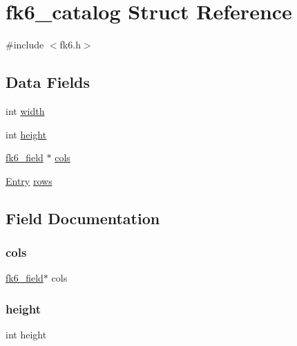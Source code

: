 \hypertarget{structfk6__catalog}{}\section{fk6\+\_\+catalog Struct Reference}
\label{structfk6__catalog}


{\ttfamily \#include $<$fk6.\+h$>$}

\subsection*{Data Fields}
\begin{DoxyCompactItemize}
\item 
int \mbox{\hyperlink{structfk6__catalog_a2474a5474cbff19523a51eb1de01cda4}{width}}
\item 
int \mbox{\hyperlink{structfk6__catalog_ad12fc34ce789bce6c8a05d8a17138534}{height}}
\item 
\mbox{\hyperlink{structfk6__field}{fk6\+\_\+field}} $\ast$ \mbox{\hyperlink{structfk6__catalog_a455b7a6cae54e77f0740b816a38d93ad}{cols}}
\item 
\mbox{\hyperlink{struct_entry}{Entry}} \mbox{\hyperlink{structfk6__catalog_a43460f7d2ae6b7f4e1577fba8b51894e}{rows}}
\end{DoxyCompactItemize}


\subsection{Field Documentation}
\mbox{\label{structfk6__catalog_a455b7a6cae54e77f0740b816a38d93ad}} 
\subsubsection{\texorpdfstring{cols}{cols}}
{\footnotesize\ttfamily \mbox{\hyperlink{structfk6__field}{fk6\+\_\+field}}$\ast$ cols}

\mbox{\label{structfk6__catalog_ad12fc34ce789bce6c8a05d8a17138534}} 
\subsubsection{\texorpdfstring{height}{height}}
{\footnotesize\ttfamily int height}

